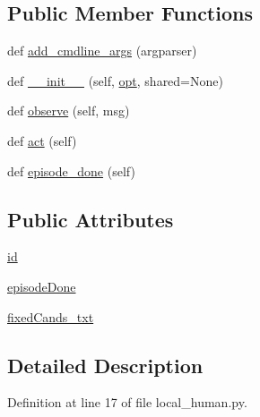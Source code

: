 \subsection*{Public Member Functions}
\begin{DoxyCompactItemize}
\item 
def \hyperlink{classparlai_1_1agents_1_1local__human_1_1local__human_1_1LocalHumanAgent_abc9993870cbd73a7706abef20021d6ca}{add\+\_\+cmdline\+\_\+args} (argparser)
\item 
def \hyperlink{classparlai_1_1agents_1_1local__human_1_1local__human_1_1LocalHumanAgent_ae6f3a4687b2a0c78d55f43bd89960fb0}{\+\_\+\+\_\+init\+\_\+\+\_\+} (self, \hyperlink{classparlai_1_1core_1_1agents_1_1Agent_ab3b45d2754244608c75d4068b90cd051}{opt}, shared=None)
\item 
def \hyperlink{classparlai_1_1agents_1_1local__human_1_1local__human_1_1LocalHumanAgent_aa204d28672d6580895d95aed167cb129}{observe} (self, msg)
\item 
def \hyperlink{classparlai_1_1agents_1_1local__human_1_1local__human_1_1LocalHumanAgent_a8959f66f1f70152c13552f99f5b10067}{act} (self)
\item 
def \hyperlink{classparlai_1_1agents_1_1local__human_1_1local__human_1_1LocalHumanAgent_a5c598c26dfd30db3120dac0cf02daf67}{episode\+\_\+done} (self)
\end{DoxyCompactItemize}
\subsection*{Public Attributes}
\begin{DoxyCompactItemize}
\item 
\hyperlink{classparlai_1_1agents_1_1local__human_1_1local__human_1_1LocalHumanAgent_a3b48630b9efada11b53cf37cbf269cce}{id}
\item 
\hyperlink{classparlai_1_1agents_1_1local__human_1_1local__human_1_1LocalHumanAgent_abbcf0b2948c89b6c42a10ef1c81457ce}{episode\+Done}
\item 
\hyperlink{classparlai_1_1agents_1_1local__human_1_1local__human_1_1LocalHumanAgent_a25f1a4e682f5cdbd61b211b1c9d5cf44}{fixed\+Cands\+\_\+txt}
\end{DoxyCompactItemize}


\subsection{Detailed Description}


Definition at line 17 of file local\+\_\+human.\+py.



